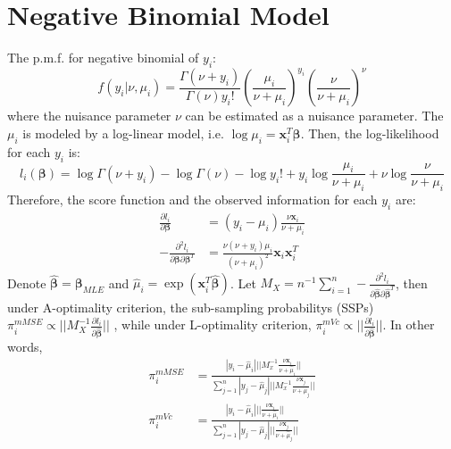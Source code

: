 \documentclass[]{article}
\begin{document}
\section{Negative Binomial Model}
The p.m.f. for negative binomial of $y_i$:
$$
f(y_i|\nu, \mu_i) = \frac{\Gamma(\nu + y_i)}{\Gamma(\nu)y_i!}\left(\frac{\mu_i}{\nu + \mu_i}\right)^{y_i}\left(\frac{\nu}{\nu + \mu_i}\right)^{\nu}
$$
where the nuisance parameter $\nu$ can be estimated as a nuisance parameter. The $\mu_i$ is modeled by a log-linear model, i.e. $\log{\mu_i} = \boldsymbol{x}_i^{T}\boldsymbol{\beta}$. Then, the log-likelihood for each $y_i$ is:
$$
l_i(\boldsymbol{\beta}) = \log{\Gamma(\nu + y_i)} - \log{\Gamma(\nu)} - \log{y_i!} + y_i\log{\frac{\mu_i}{\nu + \mu_i}} + \nu\log{\frac{\nu}{\nu + \mu_i}}
$$
Therefore, the score function and the observed information for each $y_i$ are:
\begin{align*}
	\frac{\partial l_i}{\partial \boldsymbol{\beta}} &= (y_i - \mu_i)\frac{\nu \boldsymbol{x}_i}{\nu + \mu_i} \\
	-\frac{\partial^2 l_i}{\partial \boldsymbol{\beta}\partial \boldsymbol{\beta}^{T}} &= \frac{\nu(\nu + y_i)\mu_i}{(\nu + \mu_i)^2}\boldsymbol{x}_i\boldsymbol{x}_i^{T}
\end{align*}
Denote $\hat{\boldsymbol{\beta}} = \boldsymbol{\beta}_{MLE}$ and $\hat{\mu}_i = \exp(\boldsymbol{x}_i^{T}\hat{\boldsymbol{\beta}})$.
 Let $M_{X} = n^{-1}\sum_{i=1}^{n}-\frac{\partial^2 l_i}{\partial \hat{\boldsymbol{\beta}}\partial \hat{\boldsymbol{\beta}}^{T}}$, then under A-optimality criterion, the sub-sampling probabilitys (SSPs) $\pi_i^{mMSE} \propto ||M^{-1}_{X}\frac{\partial l_i}{\partial \hat{\boldsymbol{\beta}}}||$ , while under L-optimality criterion, $\pi_i^{mVc} \propto ||\frac{\partial l_i}{\partial \hat{\boldsymbol{\beta}}}||$. In other words,
\begin{align*}
	\pi_i^{mMSE} &= \frac{|y_i - \hat{\mu}_i|||M_x^{-1}\frac{\nu \boldsymbol{x}_i}{\nu + \hat{\mu}_i}||}{\sum_{j=1}^{n}|y_j - \hat{\mu}_j|||M_x^{-1}\frac{\nu \boldsymbol{x}_j}{\nu + \hat{\mu}_j}||}\\
	\pi_i^{mVc} &=\frac{|y_i - \hat{\mu}_i|||\frac{\nu \boldsymbol{x}_i}{\nu + \hat{\mu}_i}||}{\sum_{j=1}^{n}|y_j - \hat{\mu}_j|||\frac{\nu \boldsymbol{x}_j}{\nu + \hat{\mu}_j}||}
\end{align*}
\end{document}
